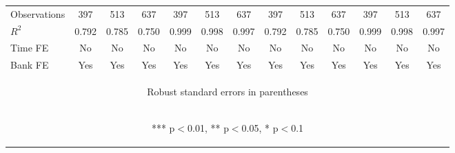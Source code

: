\documentclass[]{article}
\begin{document}
\begin{center}
\begin{tabular}{lcccccccccccc}
Observations & 397 & 513 & 637 & 397 & 513 & 637 & 397 & 513 & 637 & 397 & 513 & 637 \\
$R^2$ & 0.792 & 0.785 & 0.750 & 0.999 & 0.998 & 0.997 & 0.792 & 0.785 & 0.750 & 0.999 & 0.998 & 0.997 \\
Time FE & No & No & No & No & No & No & No & No & No & No & No & No \\
 Bank FE & Yes & Yes & Yes & Yes & Yes & Yes & Yes & Yes & Yes & Yes & Yes & Yes \\ \hline
\multicolumn{13}{c}{\begin{footnotesize} Robust standard errors in parentheses\end{footnotesize}} \\
\multicolumn{13}{c}{\begin{footnotesize} *** p$<$0.01, ** p$<$0.05, * p$<$0.1\end{footnotesize}} \\
\end{tabular}
\end{center}
\end{document}
